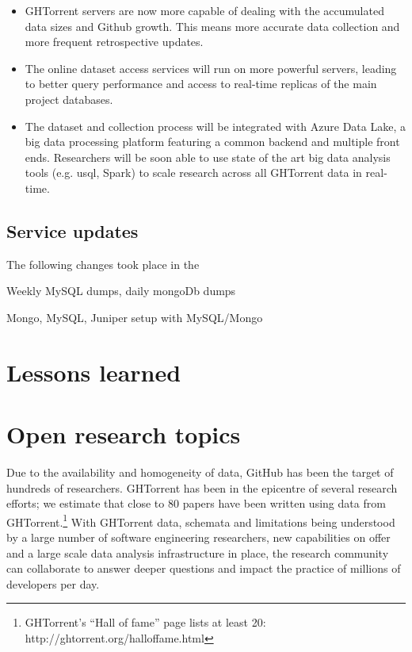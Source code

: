 \documentclass{sig-alternate}
\begin{document}
\begin{itemize}

  \item GHTorrent servers are now more capable of dealing with the accumulated
    data sizes and Github growth. This means more accurate data collection
    and more frequent retrospective updates.

  \item The online dataset access services will run on more powerful servers,
    leading to better query performance and access to real-time replicas of
    the main project databases.

  \item The dataset and collection process will be integrated with Azure
    Data Lake, a big data processing platform featuring a common backend
    and multiple front ends. Researchers will be soon able to use state
    of the art big data analysis tools (e.g. {\sc usql}, Spark) to scale
    research across all GHTorrent data in real-time.

\end{itemize}


\subsection{Service updates}

The following changes took place in the 

Weekly MySQL dumps, daily mongoDb dumps

Mongo, MySQL, Juniper setup with MySQL/Mongo

\section{Lessons learned}



\section{Open research topics}

Due to the availability and homogeneity of data, GitHub has been the target of
hundreds of researchers. GHTorrent has been in the epicentre of several research
efforts; we estimate that close to 80 papers have been written using data from
GHTorrent.\footnote{GHTorrent's ``Hall of fame'' page lists at least 20:
http://ghtorrent.org/halloffame.html} With GHTorrent data, schemata and
limitations being understood by a large number of software engineering
researchers, new capabilities on offer and a large scale data analysis
infrastructure in place, the research community can collaborate to answer deeper
questions and impact the practice of millions of developers per day.
\end{document}
